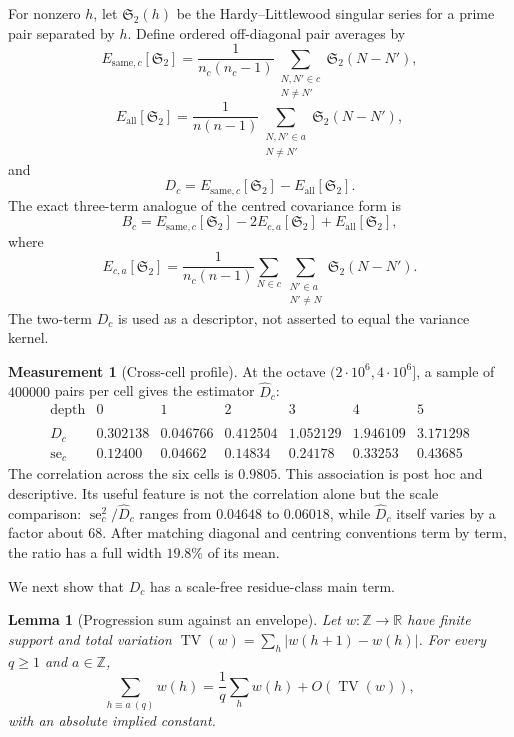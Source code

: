 \documentclass[11pt,a4paper]{article}
\theoremstyle{plain}
\newtheorem{lemma}[theorem]{Lemma}
\theoremstyle{definition}
\newtheorem{measurement}[theorem]{Measurement}
\theoremstyle{remark}
\renewcommand{\SS}{\mathfrak{S}}
\newcommand{\widehatD}{\widehat D}
\begin{document}
For nonzero $h$, let $\SS_2(h)$ be the Hardy--Littlewood singular series
for a prime pair separated by $h$.  Define ordered off-diagonal pair
averages by
\[
 E_{\mathrm{same},c}[\SS_2]
 =\frac1{n_c(n_c-1)}
   \sum_{\substack{N,N'\in c\\N\ne N'}}\SS_2(N-N'),
\]
\[
 E_{\mathrm{all}}[\SS_2]
 =\frac1{n(n-1)}
   \sum_{\substack{N,N'\in a\\N\ne N'}}\SS_2(N-N'),
\]
and
\begin{equation}\label{eq:Dc}
 D_c=E_{\mathrm{same},c}[\SS_2]-E_{\mathrm{all}}[\SS_2].
\end{equation}
The exact three-term analogue of the centred covariance form is
\[
 B_c=E_{\mathrm{same},c}[\SS_2]
     -2E_{c,a}[\SS_2]+E_{\mathrm{all}}[\SS_2],
\]
where
\[
 E_{c,a}[\SS_2]=\frac1{n_c(n-1)}
 \sum_{N\in c}\sum_{\substack{N'\in a\\N'\ne N}}\SS_2(N-N').
\]
The two-term $D_c$ is used as a descriptor, not asserted to equal the
variance kernel.

\begin{measurement}[Cross-cell profile]\label{meas:Dc}
At the octave $(2\cdot10^6,4\cdot10^6]$, a sample of $400000$ pairs per
cell gives the estimator $\widehatD_c$:
\[
\begin{array}{r|cccccc}
 \text{depth}&0&1&2&3&4&5\\\hline
 \widehatD_c&0.302138&0.046766&0.412504&1.052129&1.946109&3.171298\\
 \operatorname{se}_c&0.12400&0.04662&0.14834&0.24178&0.33253&0.43685
\end{array}
\]
The correlation across the six cells is $0.9805$.  This association is
post hoc and descriptive.  Its useful feature is not the correlation
alone but the scale comparison: $\operatorname{se}_c^2/\widehatD_c$
ranges from $0.04648$ to $0.06018$, while $\widehatD_c$ itself varies by
a factor about $68$.  After matching diagonal and centring conventions
term by term, the ratio has a full width $19.8\%$ of its mean.
\end{measurement}

We next show that $D_c$ has a scale-free residue-class main term.

\begin{lemma}[Progression sum against an envelope]\label{lem:envtv}
Let $w:\mathbb Z\to\mathbb R$ have finite support and total variation
$\operatorname{TV}(w)=\sum_h|w(h+1)-w(h)|$.  For every $q\geq1$ and
$a\in\mathbb Z$,
\[
 \sum_{h\equiv a\ (q)}w(h)
 =\frac1q\sum_hw(h)+O(\operatorname{TV}(w)),
\]
with an absolute implied constant.
\end{lemma}
\end{document}
